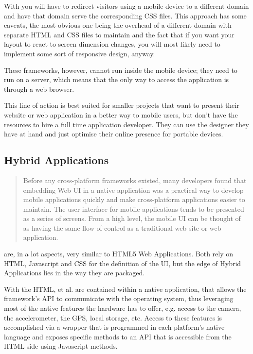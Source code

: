 With  you will have to redirect visitors using a mobile device to a different domain and have that domain serve the corresponding CSS files. This approach has some caveats, the most obvious one being the overhead of a different domain with separate HTML and CSS files to maintain and the fact that if you want your layout to react to screen dimension changes, you will most likely need to implement some sort of responsive design, anyway.   
 

These frameworks, however, cannot run inside the mobile device; they need to run on a server, which means that the only way to access the application is through a web browser.


This line of action is best suited for smaller projects that want to present their website or web application in a better way to mobile users, but don't have the resources to hire a full time application developer. They can use the designer they have at hand and just optimise their online presence for portable devices.

\subsection{Hybrid Applications}\label{sec:hyb_app}
\begin{quotation}
Before any cross-platform frameworks existed, many developers found that embedding Web UI in a native application was a practical way to develop mobile applications quickly and make cross-platform applications easier to maintain. The user interface for mobile applications tends to be presented as a series of screens. From a high level, the mobile UI can be thought of as having the same flow-of-control as a traditional web site or web application. \cite[p. 28]{allen:2010}
\end{quotation}

 are, in a lot aspects, very similar to HTML5 Web Applications. Both rely on HTML, Javascript and CSS for the definition of the UI, but the edge of Hybrid Applications lies in the way they are packaged.


With  the HTML, et al. are contained within a native application, that allows the framework's API to communicate with the operating system, thus leveraging most of the native features the hardware has to offer, e.g. access to the camera, the accelerometer, the GPS, local storage, etc. Access to these features is accomplished via a wrapper that is programmed in each platform's native language and exposes specific methods to an API that is accessible from the HTML side using Javascript methods.


